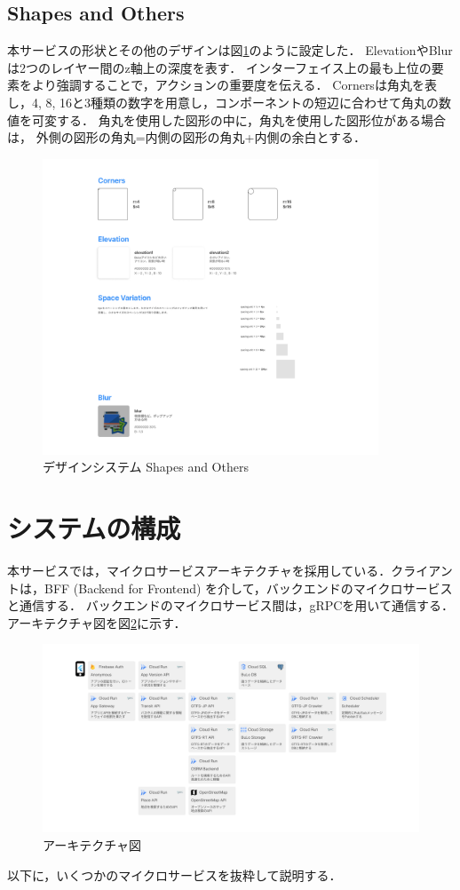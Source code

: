 \subsection{Shapes and Others}
    本サービスの形状とその他のデザインは図\ref{fig:shapes}のように設定した．
    ElevationやBlurは2つのレイヤー間のz軸上の深度を表す．
    インターフェイス上の最も上位の要素をより強調することで，アクションの重要度を伝える．
    Cornersは角丸を表し，4, 8, 16と3種類の数字を用意し，コンポーネントの短辺に合わせて角丸の数値を可変する．
    角丸を使用した図形の中に，角丸を使用した図形位がある場合は，
    外側の図形の角丸=内側の図形の角丸+内側の余白とする．
\begin{figure}[H]
    \centering
    \includegraphics[width=10cm]{images/shapes.png}
    \caption{デザインシステム Shapes and Others}
    \label{fig:shapes}
\end{figure}

\section{システムの構成}
本サービスでは，マイクロサービスアーキテクチャを採用している．クライアントは，BFF (Backend for Frontend) を介して，バックエンドのマイクロサービスと通信する．
バックエンドのマイクロサービス間は，gRPCを用いて通信する．アーキテクチャ図を図\ref{fig:architecture}に示す．
\begin{figure}[H]
    \centering
    \includegraphics[width=14cm]{images/architecture_diagram.png}
    \caption{アーキテクチャ図}
    \label{fig:architecture}
\end{figure}
以下に，いくつかのマイクロサービスを抜粋して説明する．

